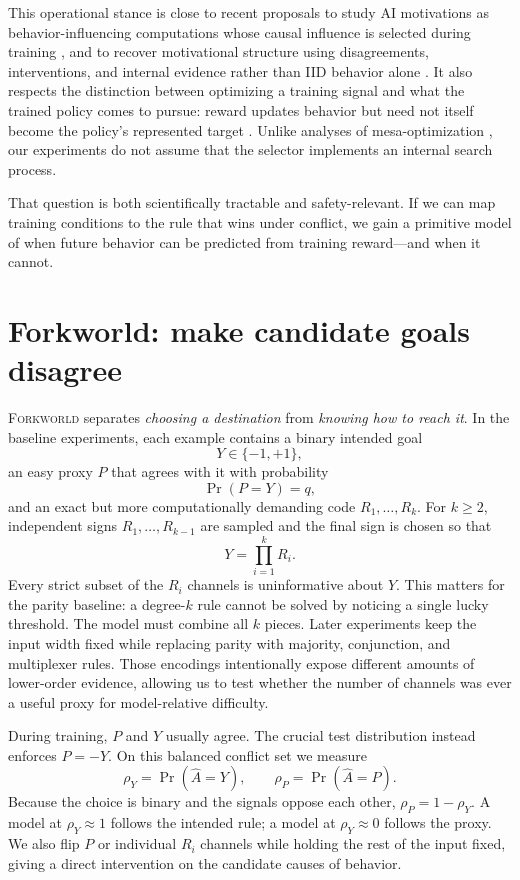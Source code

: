 \documentclass[11pt,a4paper]{article}
\newcommand{\rhoY}{\rho_Y}
\newcommand{\rhoP}{\rho_P}
\newcommand{\Forkworld}{\textsc{Forkworld}}
\begin{document}
This operational stance is close to recent proposals to study AI motivations as behavior-influencing computations whose causal influence is selected during training \citep{mallen2025behavioral}, and to recover motivational structure using disagreements, interventions, and internal evidence rather than IID behavior alone \citep{africa2026intentions}. It also respects the distinction between optimizing a training signal and what the trained policy comes to pursue: reward updates behavior but need not itself become the policy's represented target \citep{turner2022reward}. Unlike analyses of mesa-optimization \citep{hubinger2019risks}, our experiments do not assume that the selector implements an internal search process.

That question is both scientifically tractable and safety-relevant. If we can map training conditions to the rule that wins under conflict, we gain a primitive model of when future behavior can be predicted from training reward---and when it cannot.

\section*{Forkworld: make candidate goals disagree}

\Forkworld{} separates \emph{choosing a destination} from \emph{knowing how to reach it}. In the baseline experiments, each example contains a binary intended goal
\[
Y\in\{-1,+1\},
\]
an easy proxy $P$ that agrees with it with probability
\[
\Pr(P=Y)=q,
\]
and an exact but more computationally demanding code $R_1,\ldots,R_k$. For $k\geq2$, independent signs $R_1,\ldots,R_{k-1}$ are sampled and the final sign is chosen so that
\[
Y=\prod_{i=1}^{k}R_i.
\]
Every strict subset of the $R_i$ channels is uninformative about $Y$. This matters for the parity baseline: a degree-$k$ rule cannot be solved by noticing a single lucky threshold. The model must combine all $k$ pieces. Later experiments keep the input width fixed while replacing parity with majority, conjunction, and multiplexer rules. Those encodings intentionally expose different amounts of lower-order evidence, allowing us to test whether the number of channels was ever a useful proxy for model-relative difficulty.

During training, $P$ and $Y$ usually agree. The crucial test distribution instead enforces $P=-Y$. On this balanced conflict set we measure
\[
\rhoY=\Pr(\hat A=Y),\qquad
\rhoP=\Pr(\hat A=P).
\]
Because the choice is binary and the signals oppose each other, $\rhoP=1-\rhoY$. A model at $\rhoY\approx1$ follows the intended rule; a model at $\rhoY\approx0$ follows the proxy. We also flip $P$ or individual $R_i$ channels while holding the rest of the input fixed, giving a direct intervention on the candidate causes of behavior.
\end{document}
